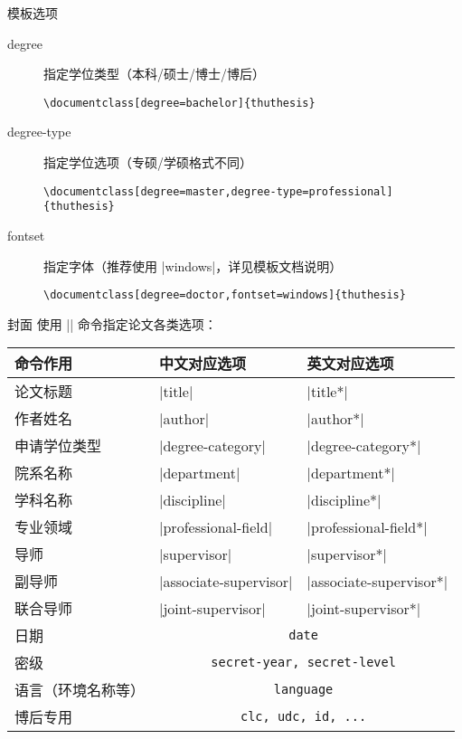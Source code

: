 \begin{frame}[fragile]{模板选项}
\begin{description}
\item[degree] 指定学位类型（本科/硕士/博士/博后）
  \begin{lstlisting}[basicstyle=\ttfamily]
\documentclass[degree=bachelor]{thuthesis}
  \end{lstlisting}
\item[degree-type] 指定学位选项（专硕/学硕格式不同）
  \begin{lstlisting}[basicstyle=\ttfamily]
\documentclass[degree=master,degree-type=professional]{thuthesis}
  \end{lstlisting}
\item[fontset] 指定字体（推荐使用 |windows|，详见模板文档说明）
  \begin{lstlisting}[basicstyle=\ttfamily]
\documentclass[degree=doctor,fontset=windows]{thuthesis}
  \end{lstlisting}
\end{description}
\end{frame}

\begin{frame}[fragile]{封面}
  使用 |\thusetup| 命令指定论文各类选项：
  \begin{table}[h]
    \centering
\footnotesize
  \begin{tabular}{lll} \toprule
    命令作用 & 中文对应选项 & 英文对应选项 \\ \midrule
  论文标题 & |title| & |title*| \\
  作者姓名&  |author| &|author*|\\
  申请学位类型 & |degree-category|&|degree-category*|\\
  院系名称 & |department| & |department*|\\
  学科名称 & |discipline| & |discipline*|\\
  专业领域 & |professional-field| & |professional-field*|\\
  导师 & |supervisor| & |supervisor*|\\
  副导师 & |associate-supervisor| & |associate-supervisor*|\\
  联合导师 & |joint-supervisor| & |joint-supervisor*|\\
  日期 & \multicolumn{2}{c}{\texttt{date}}\\
  密级 & \multicolumn{2}{c}{\texttt{secret-year, secret-level}}\\
  语言（环境名称等） & \multicolumn{2}{c}{\texttt{language}} \\ 
  博后专用 & \multicolumn{2}{c}{\texttt{clc, udc, id, ...}} \\ \bottomrule
  \end{tabular}
  \end{table}
\end{frame}

